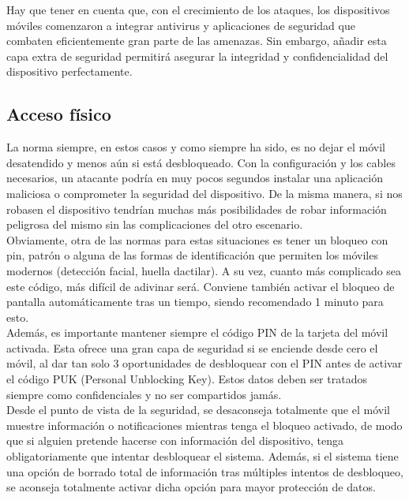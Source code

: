 \documentclass[11pt]{article}
\begin{document}
{Hay que tener en cuenta que, con el crecimiento de los ataques, los dispositivos móviles comenzaron a integrar antivirus y aplicaciones de seguridad que combaten eficientemente gran parte de las amenazas. Sin embargo, añadir esta capa extra de seguridad permitirá asegurar la integridad y confidencialidad del dispositivo perfectamente.}

\subsection{Acceso físico}

{La norma siempre, en estos casos y como siempre ha sido, es no dejar el móvil desatendido y menos aún si está desbloqueado. Con la configuración y los cables necesarios, un atacante podría en muy pocos segundos instalar una aplicación maliciosa o comprometer la seguridad del dispositivo. De la misma manera, si nos robasen el dispositivo tendrían muchas más posibilidades de robar información peligrosa del mismo sin las complicaciones del otro escenario.} \\

{Obviamente, otra de las normas para estas situaciones es tener un bloqueo con pin, patrón o alguna de las formas de identificación que permiten los móviles modernos (detección facial, huella dactilar). A su vez, cuanto más complicado sea este código, más difícil de adivinar será. Conviene también activar el bloqueo de pantalla automáticamente tras un tiempo, siendo recomendado 1 minuto para esto.} \\

{Además, es importante mantener siempre el código PIN de la tarjeta del móvil activada. Esta ofrece una gran capa de seguridad si se enciende desde cero el móvil, al dar tan solo 3 oportunidades de desbloquear con el PIN antes de activar el código PUK (Personal Unblocking Key). Estos datos deben ser tratados siempre como confidenciales y no ser compartidos jamás.} \\

{Desde el punto de vista de la seguridad, se desaconseja totalmente que el móvil muestre información o notificaciones mientras tenga el bloqueo activado, de modo que si alguien pretende hacerse con información del dispositivo, tenga obligatoriamente que intentar desbloquear el sistema. Además, si el sistema tiene una opción de borrado total de información tras múltiples intentos de desbloqueo, se aconseja totalmente activar dicha opción para mayor protección de datos.} \\
\end{document}
